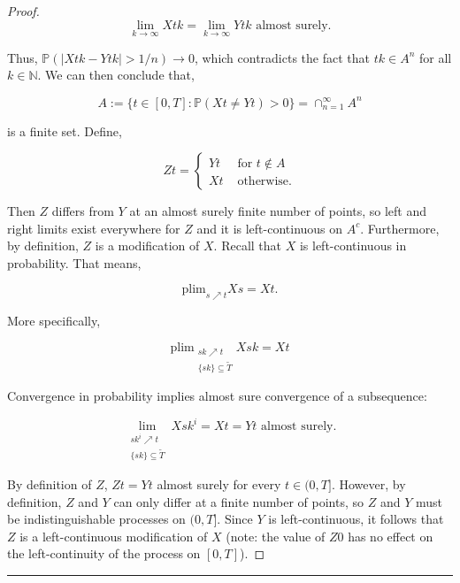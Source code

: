 \documentclass[12pt]{article}
\newcommand{\mb}{\mathbb}
\newcommand{\ra}{\rightarrow}
\newcommand{\te}{\text}
\newcommand{\lin}{\rule{\linewidth}{0.4 pt}}
\newcommand{\pr}{\mb{P}}							%
\newcommand{\T}{T}								%
\renewcommand{\t}{t}							%
\renewcommand{\tt}{s}							%
\newcommand{\X}{X}								%
\newcommand{\sln}[1]{^{#1}}						%
\newcommand{\alt}[1]{\widetilde{#1}}			%
\newcommand{\XX}{Y}								%
\newcommand{\XXX}{Z}							%
\renewcommand{\it}{k}							%
\newcommand{\Tset}{\alt{T}}						%
\newcommand{\typset}{A}							%
\begin{document}
\begin{proof}
\[\lim_{\it \ra\infty} \X{}{\t{\it}} = \lim_{\it\ra\infty} \XX{}{\t{\it}} \te{ almost surely.}\]

Thus, \(\pr(|\X{}{\t{\it}} - \XX{}{\t{\it}}| > 1/n) \ra 0\), which contradicts the fact that \(\t{\it} \in \typset\sln{n}\) for all \(\it\in\mb{N}\). We can then conclude that,

\[\typset:= \{\t\in [0,\T]: \pr(\X{}{\t} \neq \XX{}{\t}) > 0\} = \cap_{n = 1}^\infty \typset\sln{n}\]

is a finite set. Define,

\[\XXX{}{\t}= \begin{cases}
\XX{}{\t} &\te{ for } \t \notin \typset\\
\X{}{\t} &\te{ otherwise.}
\end{cases}\]

Then \(\XXX{}{}\) differs from \(\XX{}{}\) at an almost surely finite number of points, so left and right limits exist everywhere for \(\XXX{}{}\) and it is left-continuous on \(\typset^c\). Furthermore, by definition, \(\XXX{}{}\) is a modification of \(\X{}{}\). Recall that \(\X{}{}\) is left-continuous in probability. That means,

\[\te{plim}_{\tt\nearrow \t} \X{}{\tt} = \X{}{\t}.\]

More specifically,

\[\te{plim}_{\substack{\tt{\it}\nearrow \t\\\{\tt{\it}\} \subseteq \Tset}} \X{}{\tt{\it}} = \X{}{\t}\]

Convergence in probability implies almost sure convergence of a subsequence:

\[\lim_{\substack{\tt{\it\sln{i}} \nearrow \t\\\{\tt{\it}\}\subseteq \Tset}} \X{}{\tt{\it\sln{i}}} = \X{}{\t} = \XX{}{\t} \te{ almost surely.}\]

By definition of \(\XXX{}{}\), \(\XXX{}{\t} = \XX{}{\t}\) almost surely for every \(\t \in (0,\T]\). However, by definition, \(\XXX{}{}\) and \(\XX{}{}\) can only differ at a finite number of points, so \(\XXX{}{}\) and \(\XX{}{}\) must be indistinguishable processes on \((0,\T]\). Since \(\XX{}{}\) is left-continuous, it follows that \(\XXX{}{}\) is a left-continuous modification of \(\X{}{}\) (note: the value of \(\XXX{}{0}\) has no effect on the left-continuity of the process on \([0,\T]\)).
\end{proof}

\lin
\end{document}

